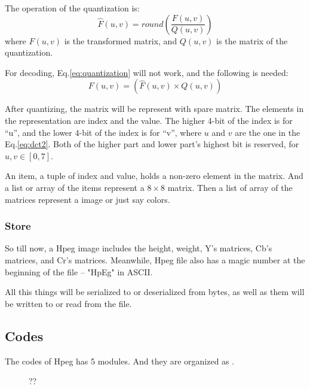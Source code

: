 \documentclass{article}
\begin{document}
The operation of the quantization is:
\begin{equation}
\label{eq:quantization}
\widehat{F}(u,v) = round\left(\frac{F(u,v)}{Q(u,v)}\right)
\end{equation}
where $F(u,v)$ is the transformed matrix, and $Q(u,v)$ is the matrix of the quantization.

For decoding, Eq.\ref{eq:quantization} will not work, and the following is needed:
\begin{equation}
\label{eq:iquantization}
F(u,v) = \left(\widehat{F}(u,v) \times Q(u,v)\right)
\end{equation}

After quantizing, the matrix will be represent with spare matrix.
The elements in the representation are index and the value. The higher 4-bit of the index is for ``u'',
and the lower 4-bit of the index is for ``v'', where $u$ and $v$ are the one in the Eq.\ref{eq:dct2}.
Both of the higher part and lower part's highest bit is reserved, for $u,v \in \left[0,7\right]$.

An item, a tuple of index and value, holds a non-zero element in the matrix.
And a list or array of the items represent a $8 \times 8$ matrix.
Then a list of array of the matrices represent a image or just say colors.

\subsubsection{Store}
\label{sec:hpeg:inside:store}

So till now, a Hpeg image includes the height, weight, Y's matrices, Cb's matrices, and Cr's matrices.
Meanwhile, Hpeg file also has a magic number at the beginning of the file -- "HpEg" in ASCII.

All this things will be serialized to or deserialized from bytes, as well as them will be written to or
read from the file.

\subsection{Codes}
\label{sec:hpeg:codes}

The codes of Hpeg has 5 modules. And they are organized as .

\begin{figure}
    \centering
    \caption{??}
\end{figure}
\end{document}
